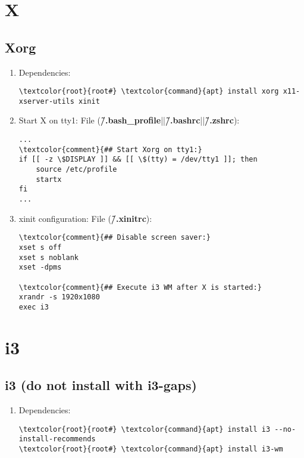 \documentclass[10pt, a4paper, onecolumn, openany]{book} %
\begin{document}
\chapter{X}
\section{Xorg}
\begin{enumerate}
    \item Dependencies:
\begin{Verbatim}[commandchars=\\\{\}]
\textcolor{root}{root#} \textcolor{command}{apt} install xorg x11-xserver-utils xinit
\end{Verbatim}
    \item Start X on tty1:
\newline File (\textbf{\textcolor{file}{\~/.bash\_profile}}||\textbf{\textcolor{file}{\~/.bashrc}}||\textbf{\textcolor{file}{\~/.zshrc}}):
\begin{Verbatim}[commandchars=\\\{\}]
...
\textcolor{comment}{## Start Xorg on tty1:}
if [[ -z \$DISPLAY ]] && [[ \$(tty) = /dev/tty1 ]]; then
    source /etc/profile
    startx
fi
...
\end{Verbatim}
    \item xinit configuration:
\newline File (\textbf{\textcolor{file}{\~/.xinitrc}}):
\begin{Verbatim}[commandchars=\\\{\}]
\textcolor{comment}{## Disable screen saver:}
xset s off
xset s noblank
xset -dpms

\textcolor{comment}{## Execute i3 WM after X is started:}
xrandr -s 1920x1080
exec i3
\end{Verbatim}
\end{enumerate}
\chapter{i3}
\section{i3 (do not install with i3-gaps)}
\begin{enumerate}
    \item Dependencies:
\begin{Verbatim}[commandchars=\\\{\}]
\textcolor{root}{root#} \textcolor{command}{apt} install i3 --no-install-recommends
\textcolor{root}{root#} \textcolor{command}{apt} install i3-wm
\end{Verbatim}
\end{enumerate}
\end{document}

